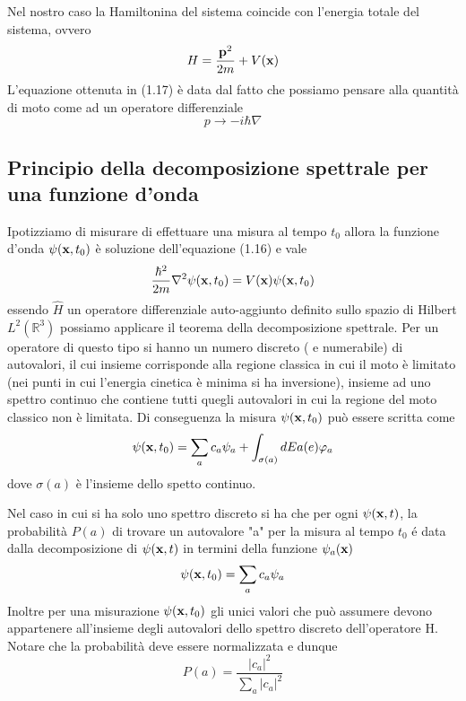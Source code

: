 \noindent Nel nostro caso la Hamiltonina del sistema coincide con l'energia totale del sistema, ovvero
\begin{equation*}
	H = \frac{\bold{p}^2}{2m} + V(\bold{x})
\end{equation*}
 L'equazione ottenuta in (1.17) \`e data dal fatto che possiamo pensare alla quantit\`a di moto come ad un operatore differenziale
 \begin{equation*}
 	 p \to -i\hbar\nabla 
 \end{equation*}

\subsection{Principio della decomposizione spettrale per una funzione d'onda}

Ipotizziamo di misurare di effettuare una misura al tempo $t_0$ allora la funzione d'onda $\psi(\bold{x},t_0)$ \`e soluzione dell'equazione (1.16) e vale 
\begin{equation*}
	\frac{\hbar^2}{2m}\nabla^2 \psi(\bold{x},t_0) = V(\bold{x})\psi(\bold{x},t_0)
\end{equation*}
essendo $\hat{H}$ un operatore differenziale auto-aggiunto definito sullo spazio di Hilbert $L^2(\mathbb{R}^3)$ possiamo applicare il teorema della decomposizione spettrale. Per un operatore di questo tipo si hanno un numero discreto ( e numerabile) di autovalori, il cui insieme corrisponde alla regione classica in cui il moto \`e limitato (nei punti in cui l'energia cinetica \`e minima si ha inversione), insieme ad uno spettro continuo che contiene tutti quegli autovalori in cui la regione del moto classico non \`e limitata. Di conseguenza la misura $\psi(\bold{x},t_0)$ pu\`o essere scritta come 
\begin{equation}
	\psi(\bold{x},t_0) = \sum_{a}c_{a}\psi_{a} + \int_{\sigma(a)}dE a(e)\varphi_a
\end{equation}
dove $\sigma(a)$ \`e l'insieme dello spetto continuo.

\noindent Nel caso in cui si ha solo uno spettro discreto si ha che per ogni $\psi(\bold{x},t)$, la probabilit\`a $P(a)$ di trovare un autovalore "a" per la misura al tempo $t_0$ \'e data dalla decomposizione di $\psi(\bold{x},t)$ in termini della funzione $\psi_{a}(\bold{x})$
\begin{equation}
	\psi(\bold{x},t_0) = \sum_{a}c_{a}\psi_{a}
\end{equation}
Inoltre per una misurazione $\psi(\bold{x},t_0)$ gli unici valori che pu\`o assumere devono appartenere all'insieme degli autovalori dello spettro discreto dell'operatore H.
Notare che la probabilit\`a deve essere normalizzata e dunque 
\begin{equation*}
	P(a) = \frac{|c_{a}|^2}{\sum_{a} |c_{a}|^2}
\end{equation*}

